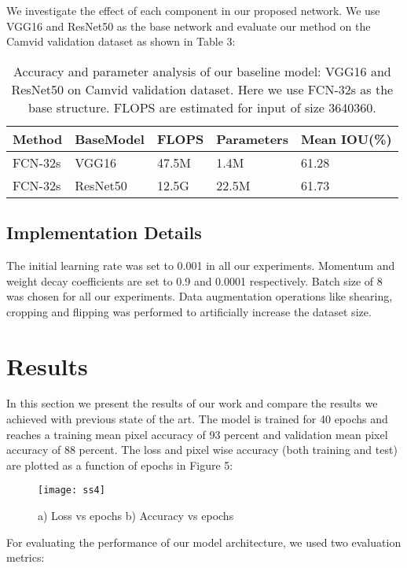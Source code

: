 \documentclass{article}
\begin{document}
We investigate the effect of each component in
our proposed network. We use VGG16 and ResNet50 as the base network and evaluate our method on the Camvid validation
dataset as shown in Table 3:

\begin{table}[h]
  \caption{Accuracy and parameter analysis of our baseline model: VGG16 and ResNet50 on Camvid validation dataset. Here we use FCN-32s as the base structure.
FLOPS are estimated for input of size 3640360.}
  \label{sample-table7}
  \centering
  \begin{tabular}{lllll}
  \toprule
    Method &BaseModel &FLOPS &Parameters &Mean IOU(\%)\\
   \midrule
FCN-32s &VGG16 &47.5M &1.4M &61.28\\
FCN-32s &ResNet50 &12.5G &22.5M &61.73\\
    \bottomrule
  \end{tabular}
\end{table}

\subsection{Implementation Details}

The initial learning rate was set to 0.001 in all our experiments. Momentum and weight decay coefficients are set to 0.9 and 0.0001 respectively. Batch size of 8 was chosen for all our experiments. Data augmentation operations like shearing, cropping and flipping was performed to artificially increase the dataset size.

\section{Results}

In this section we present the results of our work and compare the  results we achieved with previous state of the art. The model is trained for 40 epochs and reaches a training mean pixel accuracy of 93 percent and validation mean pixel accuracy of 88 percent. The loss and pixel wise accuracy (both training and test) are plotted as a function of epochs in Figure 5:

\begin{figure}[htp]
    \centering
    \texttt{[image: ss4]}
    \caption{a) Loss vs epochs b) Accuracy vs epochs}
    \label{fig4}
\end{figure}

For evaluating the performance of our model architecture, we used two evaluation metrics:
\end{document}
